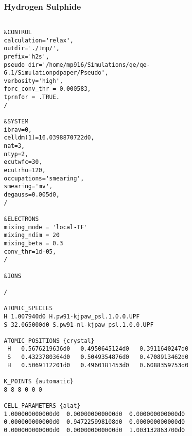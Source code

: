 \subsubsection*{Hydrogen Sulphide}
\begin{verbatim}
    
&CONTROL
calculation='relax',
outdir='./tmp/',
prefix='h2s',
pseudo_dir='/home/mp916/Simulations/qe/qe-6.1/Simulationpdpaper/Pseudo',
verbosity='high',
forc_conv_thr = 0.000583,
tprnfor = .TRUE.
/

&SYSTEM
ibrav=0,
celldm(1)=16.0398870722d0,
nat=3,
ntyp=2,
ecutwfc=30,
ecutrho=120,
occupations='smearing',
smearing='mv',
degauss=0.005d0,
/

&ELECTRONS
mixing_mode = 'local-TF'
mixing_ndim = 20
mixing_beta = 0.3
conv_thr=1d-05,
/

&IONS

/

ATOMIC_SPECIES
H 1.007940d0 H.pw91-kjpaw_psl.1.0.0.UPF
S 32.065000d0 S.pw91-nl-kjpaw_psl.1.0.0.UPF

ATOMIC_POSITIONS {crystal}
 H   0.5676219636d0   0.4950645124d0   0.3911640247d0
 S   0.4323780364d0   0.5049354876d0   0.4708913462d0
 H   0.5069112201d0   0.4960181453d0   0.6088359753d0

K_POINTS {automatic}
8 8 8 0 0 0

CELL_PARAMETERS {alat}
1.000000000000d0  0.000000000000d0  0.000000000000d0
0.000000000000d0  0.947225998108d0  0.000000000000d0
0.000000000000d0  0.000000000000d0  1.003132863700d0


\end{verbatim}

